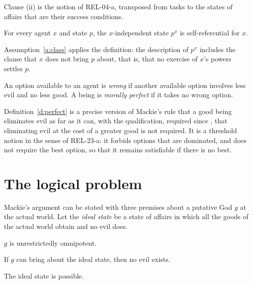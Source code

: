 \documentclass{situationist-preprint}
\begin{document}
Clause (ii) is the notion of REL-04-a, transposed from tasks to the states of affairs that are their success conditions.

\begin{assumption}[Classification]\label{a:class}
For every agent $x$ and state $p$, the $x$-independent state $p^{x}$ is self-referential for $x$.
\end{assumption}

Assumption~\ref{a:class} applies the definition: the description of $p^{x}$ includes the clause that $x$ does not bring $p$ about, that is, that no exercise of $x$'s powers settles $p$.

\begin{definition}\label{d:perfect}
An option available to an agent is \emph{wrong} if another available option involves less evil and no less good. A being is \emph{morally perfect} if it takes no wrong option.
\end{definition}

Definition~\ref{d:perfect} is a precise version of Mackie's rule that a good being eliminates evil as far as it can, with the qualification, required since \citet{Pike1963}, that eliminating evil at the cost of a greater good is not required. It is a threshold notion in the sense of REL-23-a: it forbids options that are dominated, and does not require the best option, so that it remains satisfiable if there is no best.

\section{The logical problem}\label{s:logical}

Mackie's argument can be stated with three premises about a putative God $g$ at the actual world. Let the \emph{ideal state} be a state of affairs in which all the goods of the actual world obtain and no evil does.

\begin{principle}\label{p:omni}
$g$ is unrestrictedly omnipotent.
\end{principle}

\begin{principle}[Elimination]\label{p:elim}
If $g$ can bring about the ideal state, then no evil exists.
\end{principle}

\begin{principle}\label{p:ideal}
The ideal state is possible.
\end{principle}
\end{document}
